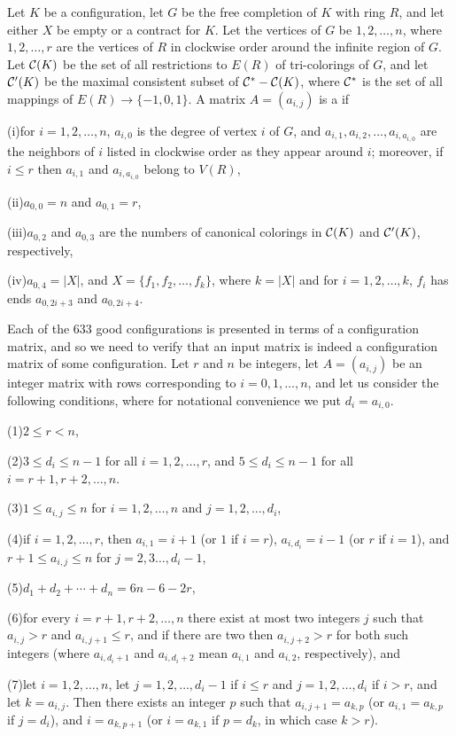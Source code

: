 Let $K$ be a configuration, let $G$ be the free completion of $K$
with ring $R$, and let either $X$ be empty or
a contract for $K$. Let the vertices of $G$ be $1,2,\ldots,n$, where
$1,2,\ldots,r$ are the vertices of $R$ in clockwise
order around the infinite region of $G$. Let ${\cal C}(K)$ be the set
of all restrictions to $E(R)$ of tri-colorings of $G$, and let
${\cal C}'(K)$ be the maximal consistent subset of ${\cal C}^*-{\cal C}(K)$,
where ${\cal C}^*$ is the set of all mappings of $E(R)\to\{-1,0,1\}$.
A matrix $A=(a_{i,j})$ is
a  if
\item{(i)}for $i=1,2,\ldots,n$, $a_{i,0}$ is the degree of vertex
$i$ of $G$, and $a_{i,1},a_{i,2},\ldots,a_{i,a_{i,0}}$ are the neighbors
of $i$ listed in clockwise order as they appear around $i$; moreover,
if $i\le r$ then $a_{i,1}$ and $a_{i,a_{i,0}}$ belong to $V(R)$,
\item{(ii)}$a_{0,0}=n$ and $a_{0,1}=r$,
\item{(iii)}$a_{0,2}$ and $a_{0,3}$ are the numbers of canonical 
colorings in ${\cal C}(K)$ and ${\cal C}'(K)$, respectively,
\item{(iv)}$a_{0,4}=|X|$, and $X=\{f_1,f_2,\ldots,f_k\}$, where
$k=|X|$ and for $i=1,2,\ldots,k$, $f_i$ has ends $a_{0,2i+3}$
and $a_{0,2i+4}$.

\noindent Each of the $633$ good configurations is presented in terms
of a configuration matrix, and so we need to verify that an 
input matrix is indeed a configuration matrix of some configuration.
Let $r$ and $n$ be integers, let $A=(a_{i,j})$ be an integer matrix
with rows corresponding to $i=0,1,\ldots,n$,
and let us consider the following conditions, where for notational
convenience we put $d_i=a_{i,0}$.
\item{(1)}$2\le r<n$,
\item{(2)}$3\le d_i\le n-1$ for all $i=1,2,\ldots,r$, and 
$5\le d_i\le n-1$ for all $i=r+1,r+2,\ldots,n$.
\item{(3)}$1\le a_{i,j}\le n$ for $i=1,2,\ldots,n$ and $j=1,2,\ldots,
d_i$,
\item{(4)}if $i=1,2,\ldots,r$, then $a_{i,1}=i+1$ (or $1$ if $i=r$),
$a_{i,d_i}=i-1$ (or $r$ if $i=1$), and
$r+1\le a_{i,j}\le n$ for 
$j=2,3\ldots,d_i-1$,
\item{(5)}$d_1+d_2+\cdots+d_n=6n-6-2r$,
\item{(6)}for every $i=r+1,r+2,\ldots,n$ there exist at most two
integers $j$ such that $a_{i,j}> r$ and $a_{i,j+1}\le r$, and if
there are two then $a_{i,j+2}>r$ for both such integers (where
$a_{i,d_i+1}$ and $a_{i,d_i+2}$ mean $a_{i,1}$ and $a_{i,2}$, 
respectively), and
\item{(7)}let $i=1,2,\ldots,n$, let $j=1,2,\ldots,d_i-1$
if $i\le r$ and $j=1,2,\ldots,d_i$ if $i>r$, and let $k=a_{i,j}$.
Then there exists an integer $p$ such that $a_{i,j+1}=a_{k,p}$
(or $a_{i,1}=a_{k,p}$ if $j=d_i$), and
$i=a_{k,p+1}$ (or $i=a_{k,1}$ if $p=d_k$, in which case $k>r$).

